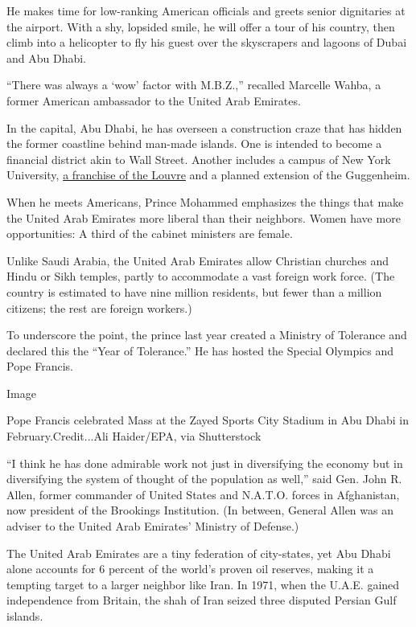 He makes time for low-ranking American officials and greets senior
dignitaries at the airport. With a shy, lopsided smile, he will offer a
tour of his country, then climb into a helicopter to fly his guest over
the skyscrapers and lagoons of Dubai and Abu Dhabi.

``There was always a `wow' factor with M.B.Z.,'' recalled Marcelle
Wahba, a former American ambassador to the United Arab Emirates.

In the capital, Abu Dhabi, he has overseen a construction craze that has
hidden the former coastline behind man-made islands. One is intended to
become a financial district akin to Wall Street. Another includes a
campus of New York University,
\href{https://www.nytimes.com/2019/03/30/arts/design/salvator-mundi-louvre-abu-dhabi.html}{a
franchise of the Louvre} and a planned extension of the Guggenheim.

When he meets Americans, Prince Mohammed emphasizes the things that make
the United Arab Emirates more liberal than their neighbors. Women have
more opportunities: A third of the cabinet ministers are female.

Unlike Saudi Arabia, the United Arab Emirates allow Christian churches
and Hindu or Sikh temples, partly to accommodate a vast foreign work
force. (The country is estimated to have nine million residents, but
fewer than a million citizens; the rest are foreign workers.)

To underscore the point, the prince last year created a Ministry of
Tolerance and declared this the ``Year of Tolerance.'' He has hosted the
Special Olympics and Pope Francis.

Image

Pope Francis celebrated Mass at the Zayed Sports City Stadium in Abu
Dhabi in February.Credit...Ali Haider/EPA, via Shutterstock

``I think he has done admirable work not just in diversifying the
economy but in diversifying the system of thought of the population as
well,'' said Gen. John R. Allen, former commander of United States and
N.A.T.O. forces in Afghanistan, now president of the Brookings
Institution. (In between, General Allen was an adviser to the United
Arab Emirates' Ministry of Defense.)

The United Arab Emirates are a tiny federation of city-states, yet Abu
Dhabi alone accounts for 6 percent of the world's proven oil reserves,
making it a tempting target to a larger neighbor like Iran. In 1971,
when the U.A.E. gained independence from Britain, the shah of Iran
seized three disputed Persian Gulf islands.

